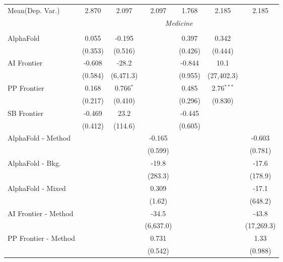 \begin{tabular}{lcccccc}
Mean(Dep. Var.) & 2.870 & 2.097 & 2.097 & 1.768 & 2.185 & 2.185 \\
 & \multicolumn{6}{c}{\textit{Medicine}} \\ \\
   AlphaFold            & 0.055   & -0.195      &           & 0.397   & 0.342        &   \\   
                        & (0.353) & (0.516)     &           & (0.426) & (0.444)      &   \\   
   AI Frontier          & -0.608  & -28.2       &           & -0.844  & 10.1         &   \\   
                        & (0.584) & (6,471.3)   &           & (0.955) & (27,402.3)   &   \\   
   PP Frontier          & 0.168   & 0.766$^{*}$ &           & 0.485   & 2.76$^{***}$ &   \\   
                        & (0.217) & (0.410)     &           & (0.296) & (0.830)      &   \\   
   SB Frontier          & -0.469  & 23.2        &           & -0.445  &              &   \\   
                        & (0.412) & (114.6)     &           & (0.605) &              &   \\   
   AlphaFold - Method   &         &             & -0.165    &         &              & -0.603\\   
                        &         &             & (0.599)   &         &              & (0.781)\\   
   AlphaFold - Bkg.     &         &             & -19.8     &         &              & -17.6\\   
                        &         &             & (283.3)   &         &              & (178.9)\\   
   AlphaFold - Mixed    &         &             & 0.309     &         &              & -17.1\\   
                        &         &             & (1.62)    &         &              & (648.2)\\   
   AI Frontier - Method &         &             & -34.5     &         &              & -43.8\\   
                        &         &             & (6,637.0) &         &              & (17,269.3)\\   
   PP Frontier - Method &         &             & 0.731     &         &              & 1.33\\   
                        &         &             & (0.542)   &         &              & (0.988)\\   

\end{tabular}
